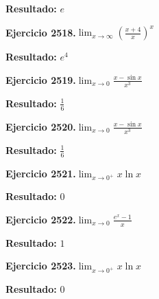 \documentclass[10pt,a4paper]{article}
\begin{document}
\begin{solbox}
\textbf{Resultado:} \(\displaystyle e\)
\end{solbox}

\begin{ejbox}
\textbf{Ejercicio 2518.}\quad $\lim_{x\to \infty} \left(\frac{x+4}{x}\right)^{x}$
\end{ejbox}

\begin{solbox}
\textbf{Resultado:} \(\displaystyle e^{4}\)
\end{solbox}

\begin{ejbox}
\textbf{Ejercicio 2519.}\quad $\lim_{x\to 0} \frac{x-\sin x}{x^3}$
\end{ejbox}

\begin{solbox}
\textbf{Resultado:} \(\displaystyle \frac{1}{6}\)
\end{solbox}

\newpage
\begin{ejbox}
\textbf{Ejercicio 2520.}\quad $\lim_{x\to 0} \frac{x-\sin x}{x^3}$
\end{ejbox}

\begin{solbox}
\textbf{Resultado:} \(\displaystyle \frac{1}{6}\)
\end{solbox}

\begin{ejbox}
\textbf{Ejercicio 2521.}\quad $\lim_{x\to 0^+} x\ln x$
\end{ejbox}

\begin{solbox}
\textbf{Resultado:} \(\displaystyle 0\)
\end{solbox}

\begin{ejbox}
\textbf{Ejercicio 2522.}\quad $\lim_{x\to 0} \frac{e^x-1}{x}$
\end{ejbox}

\begin{solbox}
\textbf{Resultado:} \(\displaystyle 1\)
\end{solbox}

\newpage
\begin{ejbox}
\textbf{Ejercicio 2523.}\quad $\lim_{x\to 0^+} x\ln x$
\end{ejbox}

\begin{solbox}
\textbf{Resultado:} \(\displaystyle 0\)
\end{solbox}
\end{document}
